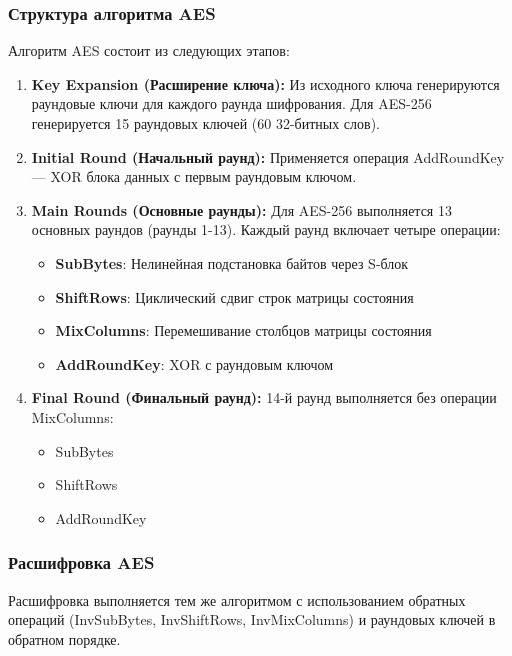 \subsubsection*{Структура алгоритма AES}

Алгоритм AES состоит из следующих этапов:

\begin{enumerate}
    \item \textbf{Key Expansion (Расширение ключа):} Из исходного ключа генерируются раундовые ключи для каждого раунда шифрования. Для AES-256 генерируется 15 раундовых ключей (60 32-битных слов).
    
    \item \textbf{Initial Round (Начальный раунд):} Применяется операция AddRoundKey — XOR блока данных с первым раундовым ключом.
    
    \item \textbf{Main Rounds (Основные раунды):} Для AES-256 выполняется 13 основных раундов (раунды 1-13). Каждый раунд включает четыре операции:
    \begin{itemize}
        \item \textbf{SubBytes}: Нелинейная подстановка байтов через S-блок
        \item \textbf{ShiftRows}: Циклический сдвиг строк матрицы состояния
        \item \textbf{MixColumns}: Перемешивание столбцов матрицы состояния
        \item \textbf{AddRoundKey}: XOR с раундовым ключом
    \end{itemize}
    
    \item \textbf{Final Round (Финальный раунд):} 14-й раунд выполняется без операции MixColumns:
    \begin{itemize}
        \item SubBytes
        \item ShiftRows
        \item AddRoundKey
    \end{itemize}
\end{enumerate}

\subsubsection*{Расшифровка AES}

Расшифровка выполняется тем же алгоритмом с использованием обратных операций (InvSubBytes, InvShiftRows, InvMixColumns) и раундовых ключей в обратном порядке.

